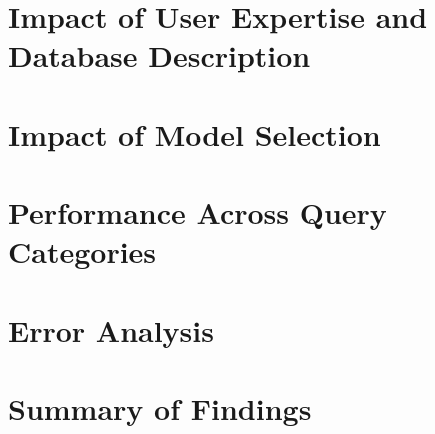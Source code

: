 \section{Impact of User Expertise and Database Description}



\section{Impact of Model Selection}



\section{Performance Across Query Categories}



\section{Error Analysis}



\section{Summary of Findings}